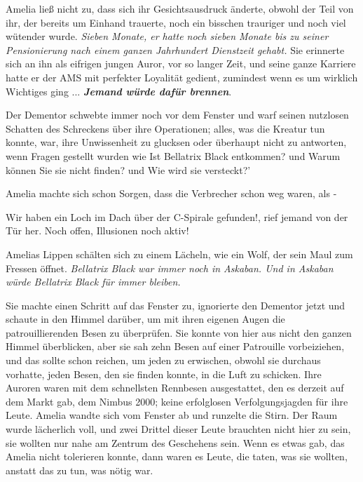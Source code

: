 Amelia ließ nicht zu, dass sich ihr Gesichtsausdruck änderte, obwohl der Teil
von ihr, der bereits um Einhand trauerte, noch ein bisschen trauriger und noch
viel wütender wurde. \emph{Sieben Monate, er hatte noch sieben Monate bis zu
seiner Pensionierung nach einem ganzen Jahrhundert Dienstzeit gehabt.} Sie
erinnerte sich an ihn als eifrigen jungen Auror, vor so langer Zeit, und seine
ganze Karriere hatte er der AMS mit perfekter Loyalität gedient, zumindest wenn
es um wirklich Wichtiges ging ... \textbf{\emph{Jemand würde dafür brennen}}.

Der Dementor schwebte immer noch vor dem Fenster und warf seinen nutzlosen
Schatten des Schreckens über ihre Operationen; alles, was die Kreatur tun
konnte, war, ihre Unwissenheit zu glucksen oder überhaupt nicht zu antworten,
wenn Fragen gestellt wurden wie \glqq{}Ist Bellatrix Black entkommen?\grqq{} und
\glqq{}Warum können Sie sie nicht finden?\grqq{} und \glqq{}Wie wird sie
versteckt?'

Amelia machte sich schon Sorgen, dass die Verbrecher schon weg waren, als -

\glqq{}Wir haben ein Loch im Dach über der C-Spirale gefunden!\grqq{}, rief
jemand von der Tür her. \glqq{}Noch offen, Illusionen noch aktiv!\grqq{}

Amelias Lippen schälten sich zu einem Lächeln, wie ein Wolf, der sein Maul zum
Fressen öffnet. \emph{Bellatrix Black war immer noch in Askaban. Und in Askaban
würde Bellatrix Black für immer bleiben.}

Sie machte einen Schritt auf das Fenster zu, ignorierte den Dementor jetzt und
schaute in den Himmel darüber, um mit ihren eigenen Augen die patrouillierenden
Besen zu überprüfen. Sie konnte von hier aus nicht den ganzen Himmel
überblicken, aber sie sah zehn Besen auf einer Patrouille vorbeiziehen, und das
sollte schon reichen, um jeden zu erwischen, obwohl sie durchaus vorhatte, jeden
Besen, den sie finden konnte, in die Luft zu schicken. Ihre Auroren waren mit
dem schnellsten Rennbesen ausgestattet, den es derzeit auf dem Markt gab, dem
Nimbus 2000; keine erfolglosen Verfolgungsjagden für ihre Leute. Amelia wandte
sich vom Fenster ab und runzelte die Stirn. Der Raum wurde lächerlich voll, und
zwei Drittel dieser Leute brauchten nicht hier zu sein, sie wollten nur nahe am
Zentrum des Geschehens sein. Wenn es etwas gab, das Amelia nicht tolerieren
konnte, dann waren es Leute, die taten, was sie wollten, anstatt das zu tun, was
nötig war.

